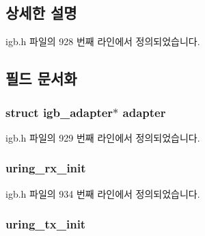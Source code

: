 \subsection{상세한 설명}


igb.\+h 파일의 928 번째 라인에서 정의되었습니다.



\subsection{필드 문서화}
\subsubsection[{\texorpdfstring{adapter}{adapter}}]{\setlength{\rightskip}{0pt plus 5cm}struct {\bf igb\+\_\+adapter}$\ast$ {\bf adapter}}\hypertarget{structigb__private__data_a194d1b705839346098846e03d7ae3108}{}\label{structigb__private__data_a194d1b705839346098846e03d7ae3108}


igb.\+h 파일의 929 번째 라인에서 정의되었습니다.

\subsubsection[{\texorpdfstring{uring\+\_\+rx\+\_\+init}{uring_rx_init}}]{ uring\+\_\+rx\+\_\+init}\hypertarget{structigb__private__data_ac9827ee428dd1c94a27b260995bb2525}{}\label{structigb__private__data_ac9827ee428dd1c94a27b260995bb2525}


igb.\+h 파일의 934 번째 라인에서 정의되었습니다.

\subsubsection[{\texorpdfstring{uring\+\_\+tx\+\_\+init}{uring_tx_init}}]{ uring\+\_\+tx\+\_\+init}\hypertarget{structigb__private__data_ad5021b5f96ba57d48c8c6300cad743af}{}\label{structigb__private__data_ad5021b5f96ba57d48c8c6300cad743af}


